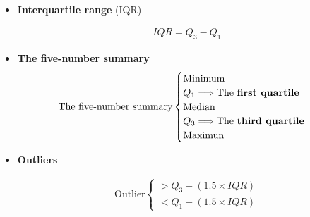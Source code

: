 \documentclass[Main.tex]{subfiles}
\begin{document}
	\begin{exercise} \hfill \\
		
		\begin{itemize}
			\item \textbf{Interquartile range} (IQR)
			\begin{definition}			
				\begin{subequations}
					\begin{align}
					IQR=Q_{3}-Q_{1}
					\end{align}
				\end{subequations}
			\end{definition}\hfill
		
			\item \textbf{The five-number summary}			
				\begin{subequations}
					\begin{align}
					\text{The five-number summary}
						\begin{cases}
							\text{Minimum}\\
							\text{$Q_{1}$}\Longrightarrow \text{The 	\textbf{first quartile}}\\
							\text{Median}\\
							\text{$Q_{3}$}\Longrightarrow \text{The \textbf{third quartile}}\\
							\text{Maximun}
						\end{cases}
					\end{align}
				\end{subequations}\hfill 
				
			\item \textbf{Outliers}
			\begin{definition}[Outlier]
				\begin{subequations}
					\begin{align}
					\text{Outlier}
						\begin{cases}
						>Q_{3}+(1.5\times IQR)\\
						<Q_{1}-(1.5\times IQR)
						\end{cases}
					\end{align}
				\end{subequations}
				\end{definition}\hfill \\ \hfill \\ \hfill \\ \hfill \\ \hfill \\
				

\end{itemize}
\end{exercise}
\end{document}
